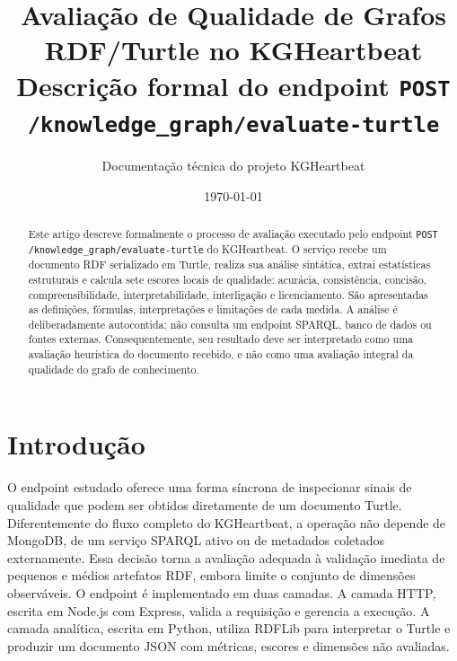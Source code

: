 \documentclass[12pt,a4paper]{article}
\title{Avaliação de Qualidade de Grafos RDF/Turtle no KGHeartbeat\\
\large Descrição formal do endpoint \texttt{POST /knowledge\_graph/evaluate-turtle}}
\author{Documentação técnica do projeto KGHeartbeat}
\date{\today}
\begin{document}
\maketitle
\begin{abstract}
Este artigo descreve formalmente o processo de avaliação executado pelo endpoint \texttt{POST /knowledge\_graph/evaluate-turtle} do KGHeartbeat. O serviço recebe um documento RDF serializado em Turtle, realiza sua análise sintática, extrai estatísticas estruturais e calcula sete escores locais de qualidade: acurácia, consistência, concisão, compreensibilidade, interpretabilidade, interligação e licenciamento. São apresentadas as definições, fórmulas, interpretações e limitações de cada medida. A análise é deliberadamente autocontida: não consulta um endpoint SPARQL, banco de dados ou fontes externas. Consequentemente, seu resultado deve ser interpretado como uma avaliação heurística do documento recebido, e não como uma avaliação integral da qualidade do grafo de conhecimento.
\end{abstract}
\section{Introdução}
O endpoint estudado oferece uma forma síncrona de inspecionar sinais de qualidade que podem ser obtidos diretamente de um documento Turtle. Diferentemente do fluxo completo do KGHeartbeat, a operação não depende de MongoDB, de um serviço SPARQL ativo ou de metadados coletados externamente. Essa decisão torna a avaliação adequada à validação imediata de pequenos e médios artefatos RDF, embora limite o conjunto de dimensões observáveis. O endpoint é implementado em duas camadas. A camada HTTP, escrita em Node.js com Express, valida a requisição e gerencia a execução. A camada analítica, escrita em Python, utiliza RDFLib para interpretar o Turtle e produzir um documento JSON com métricas, escores e dimensões não avaliadas.
\end{document}
